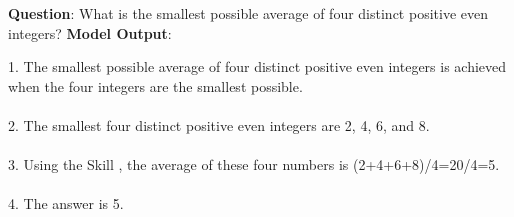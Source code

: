 \documentclass{article} \usepackage{arxiv}
\begin{document}
\begin{tcolorbox}[title = {MATH}, colback = Apricot!25!white, colframe = BrickRed!75!black] 
\textbf{Question}: What is the smallest possible average of four distinct positive even integers?
\tcblower
\textbf{Model Output}:


\quad


1. The smallest possible average of four distinct positive even integers is achieved when the four integers  are the smallest possible. \\ \\
2. The smallest four distinct positive even integers are 2, 4, 6, and 8. \\ \\
3. Using the Skill , the average of these four numbers is (2+4+6+8)/4=20/4=5. \\ \\
4. The answer is 5. 
\end{tcolorbox}
\noindent\begin{minipage}{\textwidth}
 \label{Tab:example_compose_math_skill_1}
\end{minipage}




\newpage
\end{document}
